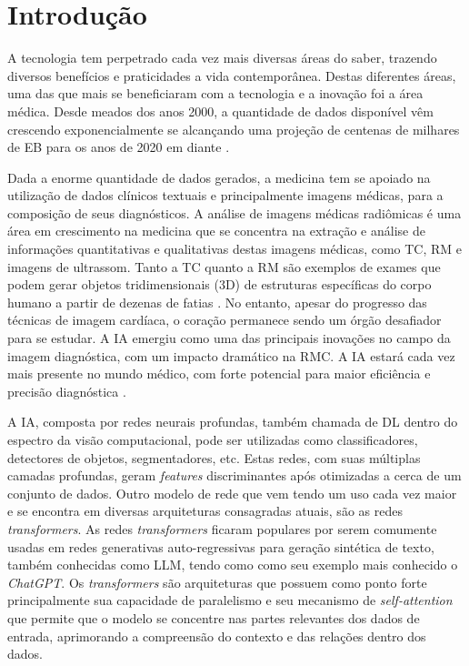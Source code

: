 \chapter{Introdução}
\label{chap:intro}

A tecnologia tem perpetrado cada vez mais diversas áreas do saber, trazendo diversos benefícios e praticidades a vida contemporânea. Destas diferentes áreas, uma das que mais se beneficiaram com a tecnologia e a inovação foi a área médica. Desde meados dos anos 2000, a quantidade de dados disponível vêm crescendo exponencialmente se alcançando uma projeção de centenas de milhares de \gls{EB} para os anos de 2020 em diante \cite{gantzDIGITALUNIVERSE2020}.

Dada a enorme quantidade de dados gerados, a medicina tem se apoiado na utilização de dados clínicos textuais e principalmente imagens médicas, para a composição de seus diagnósticos. A análise de imagens médicas radiômicas é uma área em crescimento na medicina que se concentra na extração e análise de informações quantitativas e qualitativas destas imagens médicas, como \gls{TC}, \gls{RM} e imagens de ultrassom. Tanto a \gls{TC} quanto a \gls{RM} são exemplos de exames que podem gerar objetos tridimensionais (3D) de estruturas específicas do corpo humano a partir de dezenas de fatias \cite{book:1355375}. No entanto, apesar do progresso das técnicas de imagem cardíaca, o coração permanece sendo um órgão desafiador para se estudar. A \gls{IA} emergiu como uma das principais inovações no campo da imagem diagnóstica, com um impacto dramático na \gls{RMC}. A \gls{IA} estará cada vez mais presente no mundo médico, com forte potencial para maior eficiência e precisão diagnóstica \cite{argentieroApplicationsArtificialIntelligence2022}.

A IA, composta por redes neurais profundas, também chamada de \gls{DL} dentro do espectro da visão computacional, pode ser utilizadas como classificadores, detectores de objetos, segmentadores, etc. Estas redes, com suas múltiplas camadas profundas, geram \textit{features} discriminantes após otimizadas a cerca de um conjunto de dados. Outro modelo de rede que vem tendo um uso cada vez maior e se encontra em diversas arquiteturas consagradas atuais, são as redes \textit{transformers}. As redes \textit{transformers} ficaram populares por serem comumente usadas em redes generativas auto-regressivas para geração sintética de texto, também conhecidas como \gls{LLM}, tendo como como seu exemplo mais conhecido o \textit{ChatGPT}. Os \textit{transformers} são arquiteturas que possuem como ponto forte principalmente sua capacidade de paralelismo e seu mecanismo de \textit{self-attention} que permite que o modelo se concentre nas partes relevantes dos dados de entrada, aprimorando a compreensão do contexto e das relações dentro dos dados.

